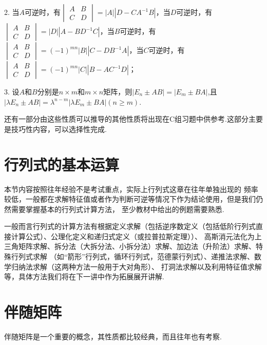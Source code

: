 2. 当$A$可逆时，有$\begin{vmatrix}
	A & B \\ C & D
\end{vmatrix} = |A||D-CA^{-1}B|$，当$D$可逆时，有
$\begin{vmatrix}
	A & B \\ C & D
\end{vmatrix} = |D||A-BD^{-1}C|$，当$B$可逆时，有
$\begin{vmatrix}
	A & B \\ C & D
\end{vmatrix} = (-1)^{mn}|B||C-DB^{-1}A|$，当$C$可逆时，有
$\begin{vmatrix}
	A & B \\ C & D
\end{vmatrix} = (-1)^{mn}|C||B-AC^{-1}D|$；

3. 设$A$和$B$分别是$n \times m$和$m \times n$矩阵，则$|E_n \pm AB|=|E_m \pm BA|$,且
$|\lambda E_n \pm AB|=\lambda^{n-m}|\lambda E_m \pm BA|(n \ge m)$.

还有一部分由这些性质可以推导的其他性质将出现在C组习题中供参考.这部分主要是技巧性内容，可以选择性完成.

\section{行列式的基本运算}
本节内容按照往年经验不是考试重点，实际上行列式这章在往年单独出现的
频率较低，一般都在求解特征值或者作为判断可逆等情况下作为结论使用，但是我们仍然需要掌握基本的行列式计算方法，
至少教材中给出的例题需要熟悉.

一般而言行列式的计算方法有根据定义求解（包括逆序数定义（包括低阶行列式直接计算公式）、公理化定义和递归式定义（或拉普拉斯定理））、
高斯消元法化为上三角矩阵求解、拆分法（大拆分法、小拆分法）求解、加边法（升阶法）求解、特殊行列式求解
（如“箭形”行列式，循环行列式，范德蒙行列式）、递推法求解、数学归纳法求解（这两种方法一般用于大对角形）、
打洞法求解以及利用特征值求解等，具体方法我们将在下一讲中作为拓展展开讲解.

\section{伴随矩阵}
伴随矩阵是一个重要的概念，其性质都比较经典，而且往年也有考察.
